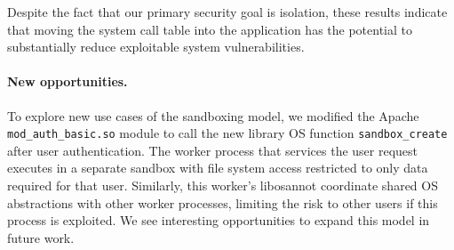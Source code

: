 



 
\begin{comment}
As Table \ref{table:vulnerabilities} illustrates almost all Linux
system call-related vulnerabilities are prevented through the \graphene{}
paradigm. These vulnerabilities are related to system calls or flags
that are blocked or restricted in \graphene{}, such as I/O control, event
polling and notification, huge pages, socket options, task stats,
\emph{etc.}  \graphene{} also restricts rarely used network protocols
such as VSOCK, TIPC and ROSE, and this prevents 41\% of network
vulnerabilities in \graphene{} systems. The Manifest file used to
restrict portions of the file system also prevented 2 FS-related
vulnerabilities. We also considered vulnerabilities in Linux
applications as preventable by \graphene{}, as all the effects are
confined in the correspondent \picoproc{} or sandbox. 
\end{comment}



Despite the fact that our primary security goal is isolation, 
these results indicate that moving the system call table into 
the application has the potential to substantially reduce exploitable 
system vulnerabilities.

\paragraph{New opportunities.}
To explore new use cases of the \graphene{} sandboxing model, we modified the 
Apache {\tt mod\_\-auth\_\-basic.so} module to call the new library OS function
{\tt sandbox\_create} after user authentication.
The work\-er process that services the user request executes in a separate sandbox 
with file system access restricted to only data required for that user.
Similarly, this worker's libosannot coordinate shared OS abstractions with other worker processes,
limiting the risk to other users if this process is exploited.
We see interesting opportunities to expand this model in future work.

